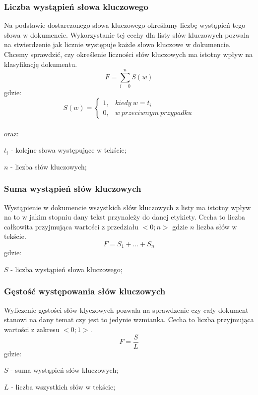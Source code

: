 \documentclass{classrep}
\begin{document}
\subsubsection{Liczba wystąpień słowa kluczowego}
Na podstawie dostarczonego słowa kluczowego określamy liczbę wystąpień tego słowa w dokumencie. Wykorzystanie tej cechy dla listy
słów kluczowych pozwala na stwierdzenie  jak licznie występuje każde słowo kluczowe w dokumencie. Chcemy sprawdzić,
czy określenie liczności słów kluczowych ma istotny wpływ na klasyfikację dokumentu.
\begin{equation}
    F=\sum_{i=0}^{n} S(w)
\end{equation}
gdzie:
\begin{equation} \label{eq:1}
    S(w)=\left\{\begin{matrix}
                    1, & kiedy\ w = t_{i}\\
                    0, & w\ przeciwnym\ przypadku
    \end{matrix}\right.
\end{equation}\\ oraz:
\begin{description}
    \item $t_{i}$ - kolejne słowa występujące w tekście;
    \item $n$ - liczba słów kluczowych;
\end{description}

\subsubsection{Suma wystąpień słów kluczowych}
Wystąpienie w dokumencie wszystkich słów kluczowych z listy ma istotny wpływ na to w jakim stopniu dany tekst
przynależy do danej etykiety. Cecha to liczba całkowita przyjmująca wartości z przedziału $<0; n>$ gdzie $n$ liczba słów w tekście.
\begin{equation}
    F=S_{1} + ... + S_{n}
\end{equation}
gdzie:\\
\begin{description}
    \item $S$ - liczba wystąpień słowa kluczowego;
\end{description}

\clearpage
\subsubsection{Gęstość występowania słów kluczowych}
Wyliczenie gęstości słów klyczowych pozwala na sprawdzenie czy cały dokument stanowi na dany temat czy jest to
jedynie wzmianka. Cecha to liczba przyjmująca wartości z zakresu $<0; 1>$.
    \begin{equation}
      F=\frac{S}{L}
    \end{equation}
gdzie:\\
\begin{description}
    \item $S$ - suma wystąpień słów kluczowych;
    \item $L$ - liczba wszystkich słów w tekście;
\end{description}
\end{document}
